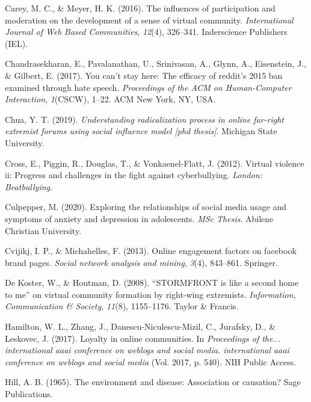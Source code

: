 \documentclass[10pt,dvipsnames]{scrartcl}
\begin{document}
\hypertarget{ref-carey2016influences}{}
Carey, M. C., \& Meyer, H. K. (2016). The influences of participation
and moderation on the development of a sense of virtual community.
\emph{International Journal of Web Based Communities}, \emph{12}(4),
326--341. Inderscience Publishers (IEL).

\hypertarget{ref-chandrasekharan2017you}{}
Chandrasekharan, E., Pavalanathan, U., Srinivasan, A., Glynn, A.,
Eisenstein, J., \& Gilbert, E. (2017). You can't stay here: The efficacy
of reddit's 2015 ban examined through hate speech. \emph{Proceedings of
the ACM on Human-Computer Interaction}, \emph{1}(CSCW), 1--22. ACM New
York, NY, USA.

\hypertarget{ref-chua2019understanding}{}
Chua, Y. T. (2019). \emph{Understanding radicalization process in online
far-right extremist forums using social influence model {[}phd
thesis{]}}. Michigan State University.

\hypertarget{ref-cross2012virtual}{}
Cross, E., Piggin, R., Douglas, T., \& Vonkaenel-Flatt, J. (2012).
Virtual violence ii: Progress and challenges in the fight against
cyberbullying. \emph{London: Beatbullying}.

\hypertarget{ref-culpepperexploring}{}
Culpepper, M. (2020). Exploring the relationships of social media usage
and symptoms of anxiety and depression in adolescents. \emph{MSc
Thesis}. Abilene Christian University.

\hypertarget{ref-cvijikj2013online}{}
Cvijikj, I. P., \& Michahelles, F. (2013). Online engagement factors on
facebook brand pages. \emph{Social network analysis and mining},
\emph{3}(4), 843--861. Springer.

\hypertarget{ref-de2008stormfront}{}
De Koster, W., \& Houtman, D. (2008). ``STORMFRONT is like a second home
to me'' on virtual community formation by right-wing extremists.
\emph{Information, Communication \& Society}, \emph{11}(8), 1155--1176.
Taylor \& Francis.

\hypertarget{ref-hamilton2017loyalty}{}
Hamilton, W. L., Zhang, J., Danescu-Niculescu-Mizil, C., Jurafsky, D.,
\& Leskovec, J. (2017). Loyalty in online communities. In
\emph{Proceedings of the... international aaai conference on weblogs and
social media. international aaai conference on weblogs and social media}
(Vol. 2017, p. 540). NIH Public Access.

\hypertarget{ref-hill1965environment}{}
Hill, A. B. (1965). The environment and disease: Association or
causation? Sage Publications.
\end{document}
